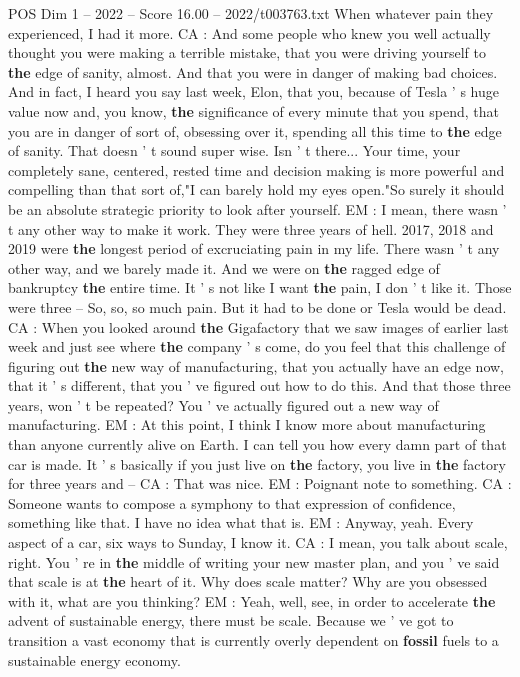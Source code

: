 \begin{textsample}{POS Dim 1 – 2022 – Score 16.00 – 2022/t003763.txt}
When whatever pain they experienced, I had it more.
CA : And some people who knew you well actually thought you were making a terrible mistake, that you were driving yourself to \textbf{the} edge of sanity, almost.
And that you were in danger of making bad choices.
And in fact, I heard you say last week, Elon, that you, because of Tesla ' s huge value now and, you know, \textbf{the} significance of every minute that you spend, that you are in danger of sort of, obsessing over it, spending all this time to \textbf{the} edge of sanity.
That doesn ' t sound super wise.
Isn ' t there...
Your time, your completely sane, centered, rested time and decision making is more powerful and compelling than that sort of,"I can barely hold my eyes open."So surely it should be an absolute strategic priority to look after yourself.
EM : I mean, there wasn ' t any other way to make it work.
They were three years of hell. 2017, 2018 and 2019 were \textbf{the} longest period of excruciating pain in my life.
There wasn ' t any other way, and we barely made it.
And we were on \textbf{the} ragged edge of bankruptcy \textbf{the} entire time.
It ' s not like I want \textbf{the} pain, I don ' t like it.
Those were three -- So, so, so much pain.
But it had to be done or Tesla would be dead.
CA : When you looked around \textbf{the} Gigafactory that we saw images of earlier last week and just see where \textbf{the} company ' s come, do you feel that this challenge of figuring out \textbf{the} new way of manufacturing, that you actually have an edge now, that it ' s different, that you ' ve figured out how to do this.
And that those three years, won ' t be repeated?
You ' ve actually figured out a new way of manufacturing.
EM : At this point, I think I know more about manufacturing than anyone currently alive on Earth.
I can tell you how every damn part of that car is made.
It ' s basically if you just live on \textbf{the} factory, you live in \textbf{the} factory for three years and -- CA : That was nice.
EM : Poignant note to something.
CA : Someone wants to compose a symphony to that expression of confidence, something like that.
I have no idea what that is.
EM : Anyway, yeah.
Every aspect of a car, six ways to Sunday, I know it.
CA : I mean, you talk about scale, right.
You ' re in \textbf{the} middle of writing your new master plan, and you ' ve said that scale is at \textbf{the} heart of it.
Why does scale matter?
Why are you obsessed with it, what are you thinking?
EM : Yeah, well, see, in order to accelerate \textbf{the} advent of sustainable energy, there must be scale.
Because we ' ve got to transition a vast economy that is currently overly dependent on \textbf{fossil} fuels to a sustainable energy economy.

\end{textsample}
